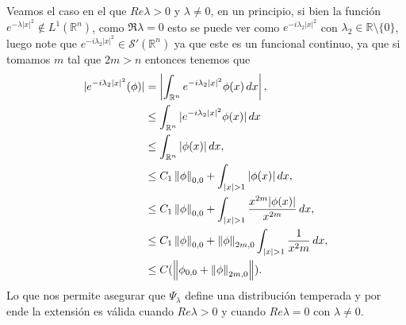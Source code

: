 \begin{homeworkProblem}
\begin{solution}
    Veamos el caso en el que $Re \lambda>0$ y $\lambda\neq 0$, en un principio, si bien la función $e^{-\lambda|x|^2}\notin L^1(\mathbb{R}^{n})$, como $\Re \lambda=0$ esto se puede ver como $e^{-i\lambda_{2}|x|^2}$ con $\lambda_{2}\in\mathbb{R}\setminus\{0\}$, luego note que $e^{-i\lambda_{2}|x|^2}\in\mathcal{S}'(\mathbb{R}^{n})$ ya que este es un funcional continuo, ya que si tomamos $m$ tal que $2m>n$ entonces tenemos que 
    \begin{align*}
      |e^{-i\lambda_{2}|x|^2}(\phi)|&=\left| \int_{\mathbb{R}^{n}}e^{-i\lambda_{2}|x|^2}\phi(x)\, dx \right|,\\
      &\leq \int_{\mathbb{R}^{n}}|e^{-i\lambda_{2}|x|^2}\phi(x)|\, dx\\
      &\leq \int_{\mathbb{R}^{n}}|\phi(x)|\, dx,\\
      &\leq C_{1}\norm{\phi}_{0,0}+\int_{|x|>1}|\phi(x)|\, dx,\\
      &\leq C_{1}\norm{\phi}_{0,0}+\int_{|x|>1}\frac{x^{2m}|\phi(x)|}{x^{2m}}\, dx,\\
      &\leq C_{1}\norm{\phi}_{0,0}+\norm{\phi}_{2m,0}\int_{|x|>1}\frac{1}{x^2m} \, dx,\\
      &\leq C(\norm{\phi_{0,0}+\norm{\phi}_{2m,0}}).
    \end{align*}
    Lo que nos permite asegurar que $\Psi_{\lambda}$ define una distribución temperada y por ende la extensión es válida cuando $Re \lambda>0$ y cuando $Re \lambda=0$ con $\lambda\neq 0$. 
  \end{solution}
\end{homeworkProblem}
